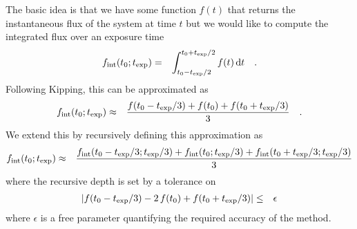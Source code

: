 \documentclass[12pt,preprint]{aastex}
\begin{document}
The basic idea is that we have some function $f(t)$ that returns the
instantaneous flux of the system at time $t$ but we would like to compute the
integrated flux over an exposure time \texp
\begin{eqnarray}
f_\mathrm{int}(t_0;{t_\mathrm{exp}}) &=& \int_{t_0-{t_\mathrm{exp}}/2}^{t_0+{t_\mathrm{exp}}/2} f(t) \,\mathrm{d} t
    \quad.
\end{eqnarray}
Following Kipping, this can be approximated as
\begin{eqnarray}
f_\mathrm{int}(t_0;{t_\mathrm{exp}}) &\approx&
    \frac{f(t_0-{t_\mathrm{exp}}/3)+f(t_0)+f(t_0+{t_\mathrm{exp}}/3)}{3} \quad.
\end{eqnarray}
We extend this by recursively defining this approximation as
\begin{eqnarray}
f_\mathrm{int}(t_0;{t_\mathrm{exp}}) &\approx&
    \frac{f_\mathrm{int}(t_0-{t_\mathrm{exp}}/3;{t_\mathrm{exp}}/3)+f_\mathrm{int}(t_0;{t_\mathrm{exp}}/3)
          +f_\mathrm{int}(t_0+{t_\mathrm{exp}}/3;{t_\mathrm{exp}}/3)}{3}
\end{eqnarray}
where the recursive depth is set by a tolerance on
\begin{eqnarray}
\left | f(t_0-{t_\mathrm{exp}}/3)-2\,f(t_0)+f(t_0+{t_\mathrm{exp}}/3) \right | &\le& \epsilon
\end{eqnarray}
where $\epsilon$ is a free parameter quantifying the required accuracy of the
method.
\end{document}

